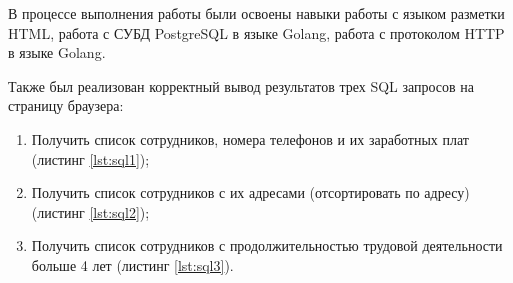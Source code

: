\Conclusion %

В процессе выполнения работы были освоены навыки работы с языком разметки HTML,
работа с СУБД PostgreSQL в языке Golang, работа с протоколом HTTP в языке Golang.

Также был реализован корректный вывод результатов трех SQL запросов на страницу браузера:
\begin{enumerate}
    \item Получить список сотрудников, номера телефонов и их заработных плат (листинг \ref{lst:sql1});
    \item Получить список сотрудников с их адресами (отсортировать по адресу) (листинг \ref{lst:sql2});
    \item Получить список сотрудников с продолжительностью трудовой деятельности больше 4 лет (листинг \ref{lst:sql3}).
\end{enumerate}

